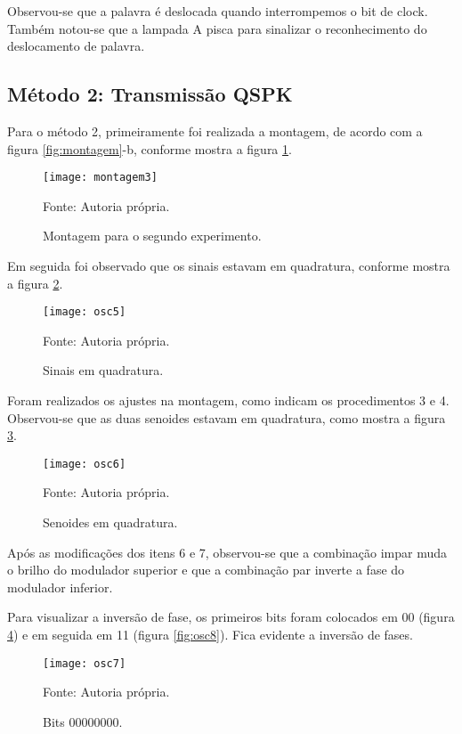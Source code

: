 Observou-se que a palavra é deslocada quando interrompemos o bit de clock. Também notou-se que a lampada A pisca para sinalizar o reconhecimento do deslocamento de palavra.

\subsection{Método 2: Transmissão QSPK}

Para o método 2, primeiramente foi realizada a montagem, de acordo com a figura \ref{fig:montagem}-b, conforme mostra a figura \ref{fig:montagem3}.

\begin{figure}[H]
  \centering
  \caption{Montagem para o segundo experimento.}
  \texttt{[image: montagem3]}
  
  \small Fonte: Autoria própria.
  \label{fig:montagem3}
\end{figure}

Em seguida foi observado que os sinais estavam em quadratura, conforme mostra a figura \ref{fig:osc5}.

\begin{figure}[H]
  \centering
  \caption{Sinais em quadratura.}
  \texttt{[image: osc5]}
  
  \small Fonte: Autoria própria.
  \label{fig:osc5}
\end{figure}

Foram realizados os ajustes na montagem, como indicam os procedimentos 3 e 4. Observou-se que as duas senoides estavam em quadratura, como mostra a figura \ref{fig:osc6}.

\begin{figure}[H]
  \centering
  \caption{Senoides em quadratura.}
  \texttt{[image: osc6]}
  
  \small Fonte: Autoria própria.
  \label{fig:osc6}
\end{figure}

Após as modificações dos itens 6 e 7, observou-se que a combinação impar muda o brilho do modulador superior e que a combinação par inverte a fase do modulador inferior.

Para visualizar a inversão de fase, os primeiros bits foram colocados em 00 (figura \ref{fig:osc7}) e em seguida em 11 (figura \ref{fig:osc8}). Fica evidente a inversão de fases.

\begin{figure}[H]
  \centering
  \caption{Bits 00000000.}
  \texttt{[image: osc7]}
  
  \small Fonte: Autoria própria.
  \label{fig:osc7}
\end{figure}

